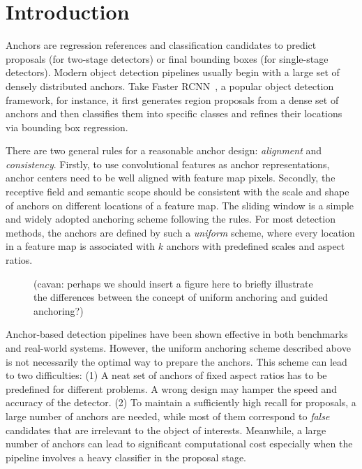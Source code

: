 \documentclass[10pt,twocolumn,letterpaper]{article}
\newcommand{\cavan}[1]{{\color{blue}(cavan: {#1})}}
\begin{document}
\section{Introduction}
\label{sec:intro}

Anchors are regression references and classification candidates to predict proposals
(for two-stage detectors) or final bounding boxes (for single-stage detectors).
Modern object detection pipelines usually begin with a large set of densely distributed anchors.
Take Faster RCNN~\cite{ren2015faster}, a popular object detection framework, for instance,
it first generates region proposals from a dense set of anchors and then
classifies them into specific classes and refines their locations via
bounding box regression.

There are two general rules for a reasonable anchor design: \emph{alignment} and \emph{consistency}.
Firstly, to use convolutional features as anchor representations, anchor centers
need to be well aligned with feature map pixels.
Secondly, the receptive field and semantic scope should be consistent with the scale and shape of anchors on different locations of a feature map.
The sliding window is a simple and widely adopted anchoring scheme following the rules.
For most detection methods, the anchors are defined by such a \emph{uniform}
scheme, where every location in a feature map is associated with $k$ anchors
with predefined scales and aspect ratios.

\begin{figure}[t]
\begin{center}
\vspace{6cm}
\caption{\cavan{perhaps we should insert a figure here to briefly illustrate the differences between the concept of uniform anchoring and guided anchoring?}\color{red}{maybe there is not enough space, and we tried to add such a figure but it is not easy to illustrate.}}
\label{fig:intro}
\end{center}
\end{figure}
\fi

Anchor-based detection pipelines have been shown effective in both
benchmarks~\cite{everingham2015pascal,lin2014microsoft,geiger2012we,deng2009imagenet}
and real-world systems.
However, the uniform anchoring scheme described above is not necessarily
the optimal way to prepare the anchors.
This scheme can lead to two difficulties:
(1) A neat set of anchors of fixed aspect ratios has to be predefined for different problems. A wrong design may hamper the speed and accuracy of the detector.
(2) To maintain a sufficiently high recall for proposals, a large number of
anchors are needed, while most of them correspond to \emph{false} candidates that are irrelevant to the object of interests.
Meanwhile, a large number of anchors can lead to significant computational cost especially
when the pipeline involves a heavy classifier in the proposal stage.
\end{document}

